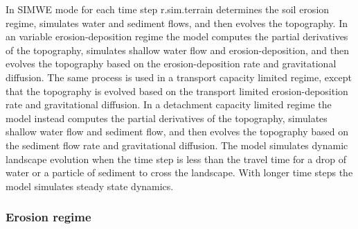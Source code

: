 \documentclass[gmd, manuscript]{copernicus}
\begin{document}
In SIMWE mode 
for each time step
r.sim.terrain
determines the soil erosion regime,
simulates water and sediment flows, 
and then evolves the topography. 
In an variable erosion-deposition regime 
the model 
computes the partial derivatives of the topography,
simulates shallow water flow and erosion-deposition,
and then evolves the topography based on the erosion-deposition rate
and gravitational diffusion.
The same process is used in
a transport capacity limited regime,
except that the topography is evolved based on 
the transport limited erosion-deposition rate
and gravitational diffusion.
In a detachment capacity limited regime
the model instead
computes the partial derivatives of the topography,
simulates shallow water flow and sediment flow,
and then evolves the topography based on the sediment flow rate
and gravitational diffusion.
The model simulates dynamic landscape evolution 
when the time step is less than the travel time 
for a drop of water or a particle of sediment to cross the landscape.
With longer time steps the model simulates steady state dynamics. 


\subsubsection{Erosion regime}
\end{document}
